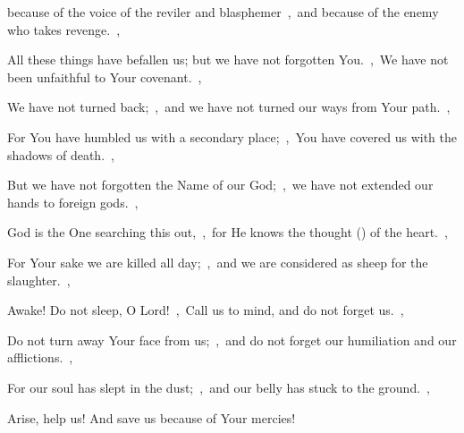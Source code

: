 \documentclass[12pt,twoside,a5paper]{article}
\begin{document}
\begin{normalparskip}
  because of the voice of the reviler and blasphemer~\sep\ and because of the enemy who takes revenge.~\sep

  All these things have befallen us; but we have not forgotten You.~\sep\ We have not been unfaithful to Your covenant.~\sep

  We have not turned back;~\sep\ and we have not turned our ways from Your path.~\sep

  For You have humbled us with a secondary place;~\sep\ You have covered us with the shadows of death.~\sep

  But we have not forgotten the Name of our God;~\sep\ we have not extended our hands to foreign gods.~\sep

  God is the One searching this out,~\sep\ for He knows the thought () of the heart.~\sep

  For Your sake we are killed all day;~\sep\ and we are considered as sheep for the slaughter.~\sep

  Awake! Do not sleep, O Lord!~\sep\ Call us to mind, and do not forget us.~\sep

  Do not turn away Your face from us;~\sep\ and do not forget our humiliation and our afflictions.~\sep

  For our soul has slept in the dust;~\sep\ and our belly has stuck to the ground.~\sep

  Arise, help us! And save us because of Your mercies!
\end{normalparskip}

\end{document}

